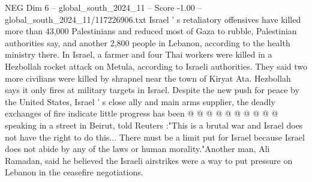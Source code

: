 \begin{textsample}{NEG Dim 6 – global\_south\_2024\_11 – Score -1.00 – global\_south\_2024\_11/117226906.txt}
Israel ' s retaliatory offensives have killed more than 43,000 Palestinians and reduced most of Gaza to rubble, Palestinian authorities say, and another 2,800 people in Lebanon, according to the health ministry there.
In Israel, a farmer and four Thai workers were killed in a Hezbollah rocket attack on Metula, according to Israeli authorities.
They said two more civilians were killed by shrapnel near the town of Kiryat Ata.
Hezbollah says it only fires at military targets in Israel.
Despite the new push for peace by the United States, Israel ' s close ally and main arms supplier, the deadly exchanges of fire indicate little progress has been @ @ @ @ @ @ @ @ @ @ speaking in a street in Beirut, told Reuters :"This is a brutal war and Israel does not have the right to do this...
There must be a limit put for Israel because Israel does not abide by any of the laws or human morality."Another man, Ali Ramadan, said he believed the Israeli airstrikes were a way to put pressure on Lebanon in the ceasefire negotiations.

\end{textsample}
